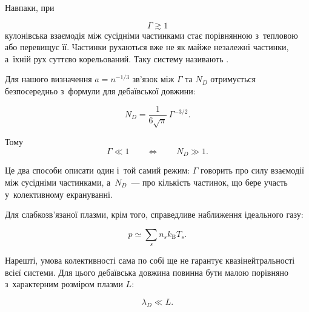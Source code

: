 Навпаки, при

\begin{equation*}
    \Gamma\gtrsim1
\end{equation*}
кулонівська взаємодія між сусідніми частинками стає порівнянною з~тепловою або перевищує
її. Частинки рухаються вже не як майже незалежні частинки, а~їхній рух суттєво
корельований. Таку систему називають .

Для нашого визначення $a=n^{-1/3}$ зв'язок між $\Gamma$ та $N_D$ отримується безпосередньо
з~формули для дебаївської довжини:

\begin{equation}\label{eq:ND-Gamma}
    N_D=
    \frac{1}{6\sqrt{\pi}}\,
    \Gamma^{-3/2}.
\end{equation}

Тому
\begin{equation*}
    \Gamma\ll1
    \qquad\Longleftrightarrow\qquad
    N_D\gg1.
\end{equation*}

Це два способи описати один і~той самий режим: $\Gamma$ говорить про силу взаємодії між
сусідніми частинками, а~$N_D$~--- про кількість частинок, що бере участь у~колективному
екрануванні.

Для слабкозв'язаної плазми, крім того, справедливе наближення ідеального газу:

\begin{equation}\label{eq:ideal-pressure}
    p\simeq\sum_s n_s k_{\mathrm B}T_s.
\end{equation}

Нарешті, умова колективності сама по собі ще не гарантує квазінейтральності всієї системи.
Для цього дебаївська довжина повинна бути малою порівняно з~характерним розміром плазми
$L$:

\begin{equation}
    \lambda_D\ll L.
\end{equation}

